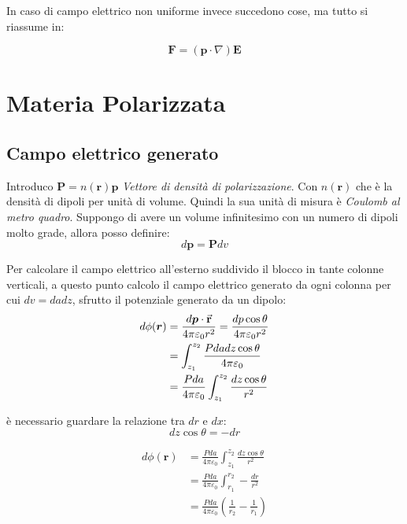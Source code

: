 \documentclass[a4paper]{scrarticle}
\begin{document}
In caso di campo elettrico non uniforme invece succedono cose, ma tutto si riassume in:

\begin{equation*}
    \bm F = (\bm p \cdot \nabla)\bm E
\end{equation*}

\section{Materia Polarizzata}

\subsection{Campo elettrico generato}

Introduco $\bm P = n(\bm r)\bm p$ \emph{Vettore di densità di polarizzazione}.
Con $n(\bm r)$ che è la densità di dipoli per unità di volume.
Quindi la sua unità di misura è \emph{Coulomb al metro quadro}.
Suppongo di avere un volume infinitesimo con un numero di dipoli molto grade, allora posso definire:
\begin{equation*}
    d\bm p = \bm P dv
\end{equation*}

Per calcolare il campo elettrico all'esterno suddivido il blocco in tante colonne verticali, a questo punto calcolo il campo elettrico generato da ogni colonna per cui $dv = da dz$, sfrutto il potenziale generato da un dipolo:
\begin{align*}
    d\phi(\bm r) &= \frac{d\bm p \cdot \va r}{4\pi\varepsilon_0r^2}= \frac{dp\cos\theta}{4\pi\varepsilon_0r^2}\\
    &= \int_{z_1}^{z_2}\frac{Pdadz\cos \theta}{4\pi\varepsilon_0}\\
    &= \frac{Pda}{4\pi\varepsilon_0}\int_{z_1}^{z_2}\frac{dz \cos \theta}{r^2}
\end{align*}

è necessario guardare la relazione tra $dr$ e $dx$:
\begin{equation*}
    dz \cos \theta = -dr
\end{equation*}

\begin{align*}
    d\phi(\bm r) &= \frac{Pda}{4\pi\varepsilon_0} \int_{z_1}^{z_2}\frac{dz\cos\theta}{r^2}\\
    &= \frac{Pda}{4\pi\varepsilon_0} \int_{r_1}^{r_2} - \frac{dr}{r^2}\\
    &= \frac{Pda}{4\pi\varepsilon_0} (\frac{1}{r_2}- \frac{1}{r_1})
\end{align*}
\end{document}
